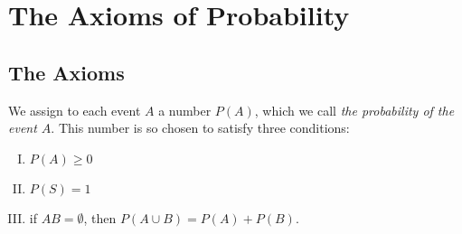 \documentclass[a4paper, oneside]{book}
\begin{document}


\chapter{The Axioms of Probability}
\section{The Axioms}
We assign to each event $A$ a number $P(A)$, which we call \textit{the probability of the event $A$}. This number is so chosen to satisfy three conditions:
\begin{enumerate}[I.]
\item $P(A)\ge 0$
\item $P(S) = 1$
\item if $AB = \emptyset $, then $P(A\cup B)=P(A)+P(B)$.
\end{enumerate}
\end{document}
